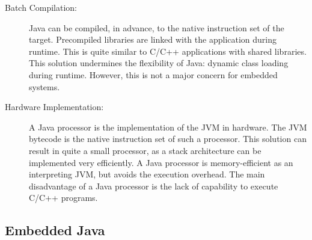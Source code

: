 \begin{description}
    \item[Batch Compilation:]
Java can be compiled, in advance, to the native instruction set of
the target. Precompiled libraries are linked with the application
during runtime. This is quite similar to C/C++ applications with
shared libraries. This solution undermines the flexibility of Java:
dynamic class loading during runtime. However, this is not a major
concern for embedded systems.


    \item[Hardware Implementation:]
A Java processor is the implementation of the JVM in hardware. The
JVM bytecode is the native instruction set of such a processor. This
solution can result in quite a small processor, as a stack
architecture can be implemented very efficiently. A Java processor
is memory-efficient as an interpreting JVM, but avoids the execution
overhead. The main disadvantage of a Java processor is the lack of
capability to execute C/C++ programs.

\end{description}

\subsection{Embedded Java}

